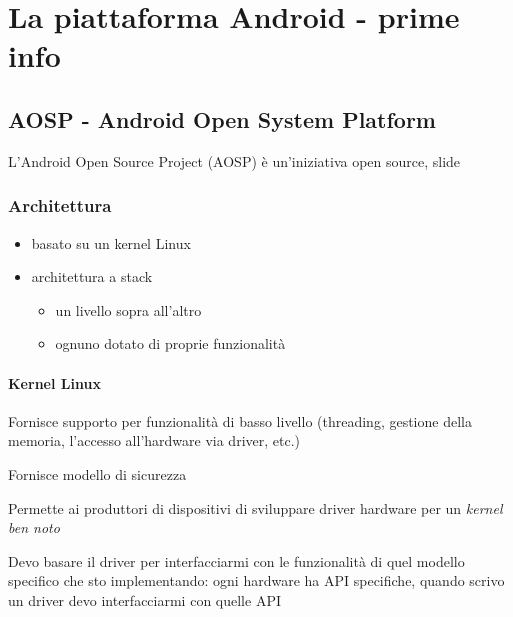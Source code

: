 
\chapter{La piattaforma Android - prime info}
\section{AOSP - Android Open System Platform}
\par L'Android Open Source Project (AOSP) è un'iniziativa open source, slide

\subsection{Architettura}
\begin{itemize}
    \item basato su un kernel Linux
    \item architettura a stack
    \begin{itemize}
        \item un livello sopra all'altro
        \item ognuno dotato di proprie funzionalità
    \end{itemize}
\end{itemize}

\subsubsection{Kernel Linux}
\par Fornisce supporto per funzionalità di basso livello (threading, gestione della memoria, l'accesso all'hardware via driver, etc.)
\par Fornisce modello di sicurezza
\par Permette ai produttori di dispositivi di sviluppare driver hardware per un \textit{kernel ben noto}
\par Devo basare il driver per interfacciarmi con le funzionalità di quel modello specifico che sto implementando: ogni hardware ha API specifiche, quando scrivo un driver devo interfacciarmi con quelle API


